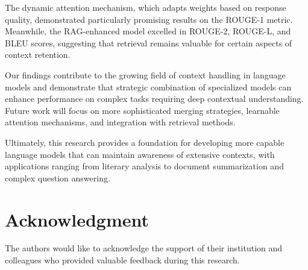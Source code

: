 \documentclass[conference]{IEEEtran}
\begin{document}
The dynamic attention mechanism, which adapts weights based on response quality, demonstrated particularly promising results on the ROUGE-1 metric. Meanwhile, the RAG-enhanced model excelled in ROUGE-2, ROUGE-L, and BLEU scores, suggesting that retrieval remains valuable for certain aspects of context retention.

Our findings contribute to the growing field of context handling in language models and demonstrate that strategic combination of specialized models can enhance performance on complex tasks requiring deep contextual understanding. Future work will focus on more sophisticated merging strategies, learnable attention mechanisms, and integration with retrieval methods.

Ultimately, this research provides a foundation for developing more capable language models that can maintain awareness of extensive contexts, with applications ranging from literary analysis to document summarization and complex question answering.

\section*{Acknowledgment}
The authors would like to acknowledge the support of their institution and colleagues who provided valuable feedback during this research.
\end{document}
